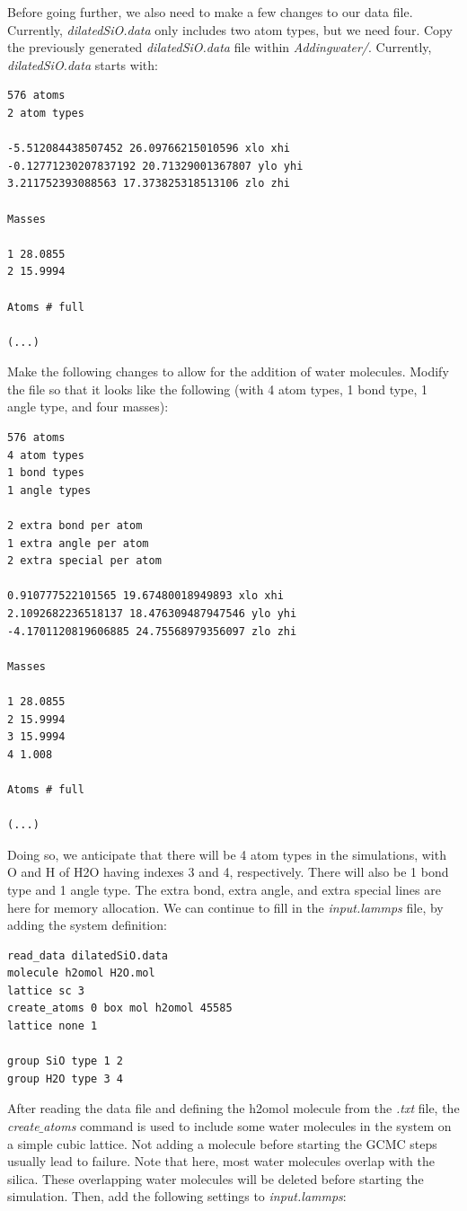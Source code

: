 \documentclass[9pt,tutorial]{livecoms}
\begin{document}
Before going further, we also need to make a few changes to our data file. Currently, \textit{dilatedSiO.data} only includes two atom types, but we need four. Copy the previously generated \textit{dilatedSiO.data} file within \textit{Addingwater/}. Currently, \textit{dilatedSiO.data} starts with:
{\normalsize \begin{verbatim}
576 atoms
2 atom types

-5.512084438507452 26.09766215010596 xlo xhi
-0.12771230207837192 20.71329001367807 ylo yhi
3.211752393088563 17.373825318513106 zlo zhi

Masses

1 28.0855
2 15.9994

Atoms # full

(...)
\end{verbatim}}
Make the following changes to allow for the addition of water molecules. Modify the file so that it looks like the following 
(with 4 atom types, 1 bond type, 1 angle type, and four masses):
{\normalsize \begin{verbatim}
576 atoms
4 atom types
1 bond types
1 angle types

2 extra bond per atom
1 extra angle per atom
2 extra special per atom

0.910777522101565 19.67480018949893 xlo xhi
2.1092682236518137 18.476309487947546 ylo yhi
-4.1701120819606885 24.75568979356097 zlo zhi

Masses

1 28.0855
2 15.9994
3 15.9994
4 1.008

Atoms # full

(...)
\end{verbatim}}
Doing so, we anticipate that there will be 4 atom types in the simulations, with O and H of H2O having indexes 3 and 4,
respectively. There will also be 1 bond type and 1 angle type. The extra bond, extra angle, and extra special lines
are here for memory allocation. We can continue to fill in the \textit{input.lammps} file, by adding the system definition:
{\normalsize \begin{verbatim}
read_data dilatedSiO.data
molecule h2omol H2O.mol
lattice sc 3
create_atoms 0 box mol h2omol 45585
lattice none 1

group SiO type 1 2
group H2O type 3 4
\end{verbatim}}
After reading the data file and defining the h2omol molecule from the \textit{.txt} file, the \textit{create$\_$atoms} command is used to include some water molecules in the system on a simple cubic lattice. Not adding a molecule before starting the GCMC steps usually lead to failure. Note that here, most water molecules overlap with the silica. These overlapping water molecules will be deleted before starting the simulation. Then, add the following settings to \textit{input.lammps}:
\end{document}
